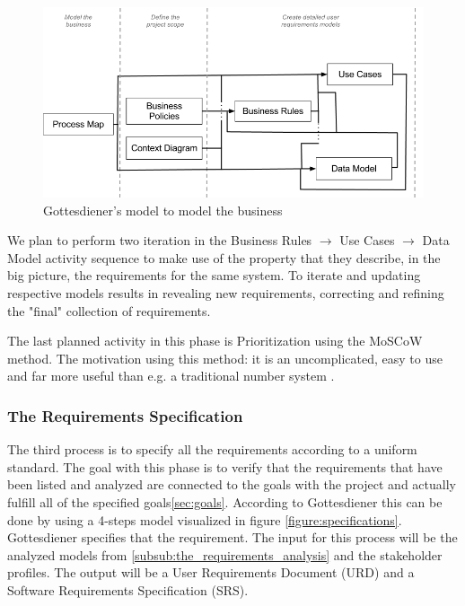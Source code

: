 \documentclass[a4paper]{article}
\begin{document}
\begin{figure}[H]
	\centering
		\includegraphics[width=1\textwidth]{images/model_the_business.png}
	\caption{Gottesdiener's model to model the business \cite{gott4}}
	\label{figure:business}
\end{figure}
     
We plan to perform two iteration in the Business Rules $\rightarrow$ Use Cases $\rightarrow$ Data Model activity sequence to make use of the property that they describe, in the big picture, the requirements for the same system. To iterate and updating respective models results in revealing new requirements, correcting and refining the "final" collection of requirements.

The last planned activity in this phase is Prioritization using the MoSCoW method. The motivation using this method: it is an uncomplicated, easy to use and far more useful than e.g. a traditional number system \cite{coleyconsulting}.

\subsubsection{The Requirements Specification}
\label{subsub:the_requirements_specification}

The third process is to specify all the requirements according to a uniform standard. The goal with this phase is to verify that the requirements that have been listed and analyzed are connected to the goals with the project and actually fulfill all of the specified goals\ref{sec:goals}. According to Gottesdiener\cite{gott5} this can be done by using a 4-steps model visualized in figure \ref{figure:specifications}. Gottesdiener specifies that the requirement. The input for this process will be the analyzed models from \ref{subsub:the_requirements_analysis} and the stakeholder profiles. The output will be a User Requirements Document (URD) and a Software Requirements Specification (SRS).
\end{document}
